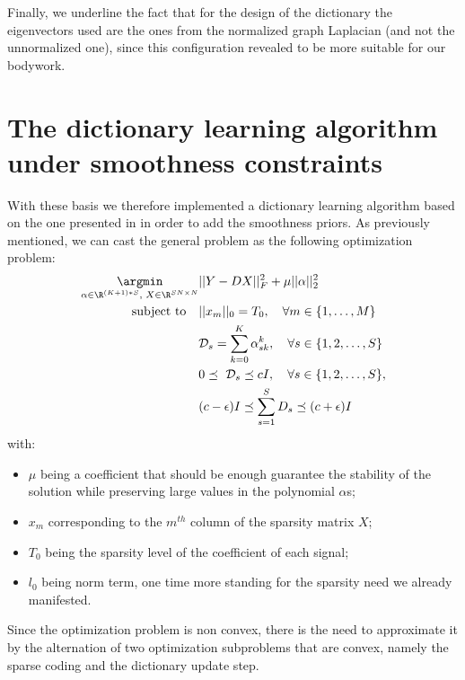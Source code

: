 Finally, we underline the fact that for the design of the dictionary the eigenvectors used are the ones from the normalized graph Laplacian (and not the unnormalized one), since this configuration revealed to be more suitable for our bodywork.

\section{The dictionary learning algorithm under smoothness constraints}
With these basis we therefore implemented a dictionary learning algorithm based on the one presented in \cite{Thanou2014} in order to add the smoothness priors. As previously mentioned, we can cast the general problem as the following optimization problem:
\begin{align}
  \underset{\small{\alpha \in \R^{(K+1)*S}, \text{ } X \in \R^{SN \times N}}}{\argmin} &||Y-DX||^2_F + \mu ||\alpha||_2^2 \label{eq:objDictionary}\\
  \text{subject to} \quad &||x_m||_0 = T_0, \quad \forall m \in \{1,\dots,M\} \notag \\
  &\mathcal{D}_s = \sum_{k=0}^{K}\alpha_{sk}^k, \quad \forall s \in \{1,2,\dots,S\} \notag \\
  &0 \preceq \text{ } \mathcal{D}_s \preceq cI, \quad \forall s \in \{1,2,\dots , S\},\notag \\
  &(c-\epsilon)I \preceq \sum_{s=1}^{S}D_s \preceq (c+\epsilon)I \notag
\end{align}
with:
\begin{itemize}
\item $\mu$ being a coefficient that should be enough guarantee the stability of the solution while preserving large values in the polynomial $\alpha$s;
\item $x_m$ corresponding to the $m^{th}$ column of the sparsity matrix $X$;
\item $T_0$ being the sparsity level of the coefficient of each signal;
\item $l_0$ being norm term, one time more standing for the sparsity need we already manifested.
\end{itemize}

Since the optimization problem is non convex, there is the need to approximate it by the alternation of two optimization subproblems that are convex, namely the sparse coding and the dictionary update step.\\

